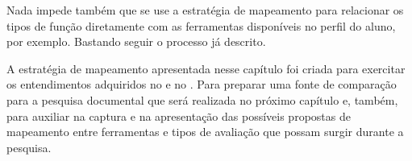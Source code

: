 Nada impede também que se use a estratégia de mapeamento para relacionar os tipos de função diretamente com as ferramentas disponíveis no perfil do aluno, por exemplo. Bastando seguir o processo já descrito.

A estratégia de mapeamento apresentada nesse capítulo foi criada para exercitar os entendimentos adquiridos no  e no . Para preparar uma fonte de comparação para a pesquisa documental que será realizada no próximo capítulo e, também, para auxiliar na captura e na apresentação das possíveis propostas de mapeamento entre ferramentas e tipos de avaliação que possam surgir durante a pesquisa.


